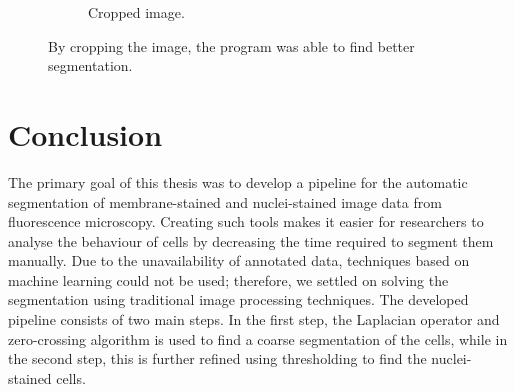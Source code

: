 \documentclass[
  digital,     %
  oneside,     %
  nosansbold,  %
  nocolorbold, %
  lof,         %
  lot,         %
]{fithesis4}
\begin{document}
\begin{figure}
\begin{subfigure}[t]{0.3\textwidth}
        \caption{Cropped image.}
    \end{subfigure}
    \caption{By cropping the image, the program was able to find better segmentation.}
    \label{fig:issues-cropping}
\end{figure}

\clearpage
\chapter{Conclusion}

The primary goal of this thesis was to develop a pipeline for the automatic
segmentation of membrane-stained and nuclei-stained image data from fluorescence microscopy.
Creating such tools makes it easier for researchers to analyse the behaviour of
cells by decreasing the time required to segment them manually. Due to the
unavailability of annotated data, techniques based on machine learning could not
be used; therefore, we settled on solving the segmentation using traditional
image processing techniques. The developed pipeline consists of two main steps.
In the first step, the Laplacian operator and zero-crossing algorithm is used to
find a coarse segmentation of the cells, while in the second step, this is
further refined using thresholding to find the nuclei-stained cells.
\end{document}
